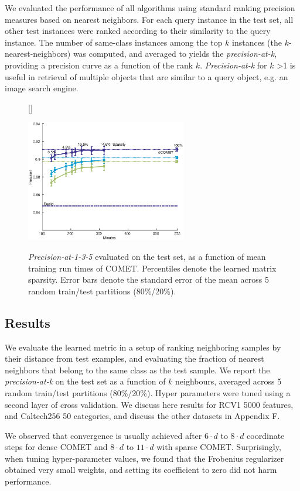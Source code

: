\documentclass[twoside,11pt]{article}
\newcommand\mat[1]{{#1}}
\newcommand{\ignore}[1]{}
\newcommand{\Vk}{\mat{V_k}}
\newcommand{\Vgrc}{\{\Vk\}_{k=1}^{d}} %
\begin{document}
We evaluated the performance of all algorithms using standard ranking precision measures based on nearest neighbors. For each query instance in the test set, all other test instances were ranked according to their similarity to the query instance. The number of same-class instances
among the top $k$ instances (the $k$-nearest-neighbors) was computed, and averaged to  yields the \textit{precision-at-k},
providing a precision curve as a function of the rank $k$. \textit{Precision-at-k} for $k$ >1 is useful in retrieval of multiple objects that are similar to a query object, e.g. an image search engine.
\begin{figure}
\captionsetup{font=small}
[\FBwidth]
{\caption{\textit{Precision-at-1-3-5} evaluated on the test set, as a function of mean training run times of COMET. Percentiles denote the learned matrix sparsity. Error bars denote the standard error of the mean across 5 random train/test partitions (80\%/20\%).}\label{spCometPrecTime}}
{\includegraphics[width=7cm]{sCOMET_precision_vs_runtime}}
\vskip 9pt
\end{figure}

\subsection{Results}\vskip -5pt
We evaluate the learned metric in a setup of ranking neighboring samples by their distance from test examples, and evaluating the fraction of nearest neighbors that belong to the same class as the test sample. We report the \textit{precision-at-k} on the test set as a function of $k$ neighbours, averaged across 5 random train/test partitions (80\%/20\%). Hyper parameters were tuned using a second layer of cross validation. We discuss here results for RCV1 5000 features, and Caltech256 50 categories, and discuss the other datasets in Appendix F.
\ignore{Figure \ref{cometConvergeFig} shows the \textit{precision-at-k} over the test sets as it progresses during learning. 
}
We observed that convergence is usually achieved after $6 \cdot d$ to $8 \cdot d$ coordinate steps for dense COMET and $8 \cdot d$ to $11 \cdot d$ with sparse COMET.
Surprisingly, when tuning hyper-parameter values, we found that the Frobenius regularizer obtained very small weights, and setting its coefficient to zero did not harm performance. 
\end{document}
